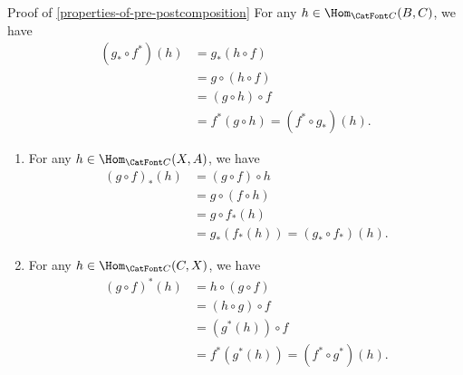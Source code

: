 \begin{Proof}{Proof of \cref{properties-of-pre-postcomposition}}%
    For any $h \in \Hom_{\CatFont C}(B,C)$, we have
    \begin{align*}
      (g_* \circ f^*)(h) &= g_* (h \circ f) \\
                         &= g \circ (h \circ f) \\
                         &= (g \circ h) \circ f \\
                         &= f^*(g \circ h) = (f^* \circ g_*)(h).
    \end{align*}

    \begin{enumerate}
      \item For any $h \in \Hom_{\CatFont C}(X,A)$, we have
            \begin{align*}
              (g \circ f)_*(h) &= (g \circ f) \circ h \\
                               &= g \circ (f \circ h) \\
                               &= g \circ f_*(h) \\
                               &= g_* (f_*(h)) = (g_* \circ f_*)(h).
            \end{align*}
      \item For any $h \in \Hom_{\CatFont C}(C,X)$, we have
            \begin{align*}
              (g \circ f)^*(h) &= h \circ (g \circ f) \\
                               &= (h \circ g) \circ f \\
                               &= (g^*(h)) \circ f \\
                               &= f^* (g^*(h)) = (f^* \circ g^*)(h).
            \end{align*}
    \end{enumerate}


\end{Proof}
